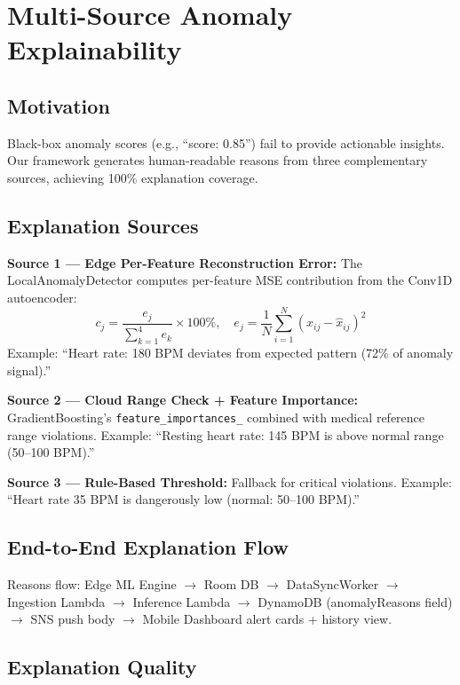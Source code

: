 \section{Multi-Source Anomaly Explainability}

\subsection{Motivation}
Black-box anomaly scores (e.g., ``score: 0.85'') fail to provide actionable insights. Our framework generates human-readable reasons from three complementary sources, achieving 100\% explanation coverage.

\subsection{Explanation Sources}

\textbf{Source 1 --- Edge Per-Feature Reconstruction Error:} The LocalAnomalyDetector computes per-feature MSE contribution from the Conv1D autoencoder:
\begin{equation}
c_j = \frac{e_j}{\sum_{k=1}^{4} e_k} \times 100\%, \quad e_j = \frac{1}{N}\sum_{i=1}^{N}(x_{ij} - \hat{x}_{ij})^2
\end{equation}
Example: ``Heart rate: 180 BPM deviates from expected pattern (72\% of anomaly signal).''

\textbf{Source 2 --- Cloud Range Check + Feature Importance:} GradientBoosting's \texttt{feature\_importances\_} combined with medical reference range violations. Example: ``Resting heart rate: 145 BPM is above normal range (50--100 BPM).''

\textbf{Source 3 --- Rule-Based Threshold:} Fallback for critical violations. Example: ``Heart rate 35 BPM is dangerously low (normal: 50--100 BPM).''

\subsection{End-to-End Explanation Flow}
Reasons flow: Edge ML Engine $\rightarrow$ Room DB $\rightarrow$ DataSyncWorker $\rightarrow$ Ingestion Lambda $\rightarrow$ Inference Lambda $\rightarrow$ DynamoDB (anomalyReasons field) $\rightarrow$ SNS push body $\rightarrow$ Mobile Dashboard alert cards + history view.

\subsection{Explanation Quality}

